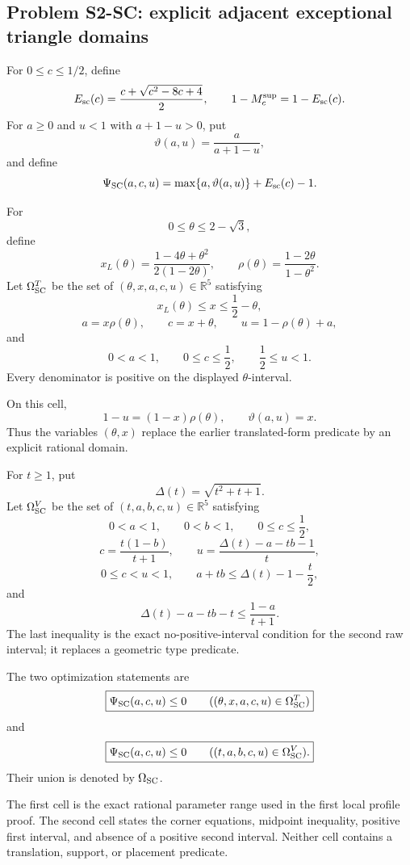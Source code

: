 \subsection{Problem S2-SC: explicit adjacent exceptional triangle domains}

For \(0\le c\le1/2\), define
\[
 E_{\rm sc}(c)
 =\frac{c+\sqrt{c^2-8c+4}}2,
 \qquad
 1-M_c^{\rm sup}=1-E_{\rm sc}(c).
\]
For \(a\ge0\) and \(u<1\) with \(a+1-u>0\), put
\[
 \vartheta(a,u)=\frac{a}{a+1-u},
\]
and define
\[
 \Psi_{\rm SC}(a,c,u)
 =\max\{a,\vartheta(a,u)\}+E_{\rm sc}(c)-1.
\]

\begin{definition}
\label{def:s2-sc-t3-domain}
For
\[
 0\le\theta\le2-\sqrt3,
\]
define
\[
 x_L(\theta)
 =\frac{1-4\theta+\theta^2}{2(1-2\theta)},
 \qquad
 \rho(\theta)=\frac{1-2\theta}{1-\theta^2}.
\]
Let \(\Omega_{\rm SC}^{T}\) be the set of
\((\theta,x,a,c,u)\in\mathbb R^5\) satisfying
\[
 x_L(\theta)\le x\le\frac12-\theta,
\]
\[
 a=x\rho(\theta),\qquad
 c=x+\theta,\qquad
 u=1-\rho(\theta)+a,
\]
and
\[
 0<a<1,\qquad
 0\le c\le\frac12,\qquad
 \frac12\le u<1.
\]
Every denominator is positive on the displayed \(\theta\)-interval.
\end{definition}

On this cell,
\[
 1-u=(1-x)\rho(\theta),
 \qquad
 \vartheta(a,u)=x.
\]
Thus the variables \((\theta,x)\) replace the earlier translated-form
predicate by an explicit rational domain.

\begin{definition}
\label{def:s2-sc-vd1-domain}
For \(t\ge1\), put
\[
 \Delta(t)=\sqrt{t^2+t+1}.
\]
Let \(\Omega_{\rm SC}^{V}\) be the set of
\((t,a,b,c,u)\in\mathbb R^5\) satisfying
\[
 0<a<1,\qquad 0<b<1,\qquad 0\le c\le\frac12,
\]
\[
 c=\frac{t(1-b)}{t+1},
 \qquad
 u=\frac{\Delta(t)-a-tb-1}{t},
\]
\[
 0\le c<u<1,
 \qquad
 a+tb\le\Delta(t)-1-\frac t2,
\]
and
\[
 \Delta(t)-a-tb-t
 \le\frac{1-a}{t+1}.
\]
The last inequality is the exact no-positive-interval condition for the
second raw interval; it replaces a geometric type predicate.
\end{definition}

\begin{definition}[Problem S2-SC]
\label{prob:s2-rescuer}
The two optimization statements are
\[
 \boxed{
 \Psi_{\rm SC}(a,c,u)\le0
 \qquad
 ((\theta,x,a,c,u)\in\Omega_{\rm SC}^{T})
 }
\]
and
\[
 \boxed{
 \Psi_{\rm SC}(a,c,u)\le0
 \qquad
 ((t,a,b,c,u)\in\Omega_{\rm SC}^{V}).
 }
\]
Their union is denoted by \(\Omega_{\rm SC}\).
\end{definition}

The first cell is the exact rational parameter range used in the first local
profile proof.  The second cell states the corner equations, midpoint
inequality, positive first interval, and absence of a positive second
interval.  Neither cell contains a translation, support, or placement
predicate.

